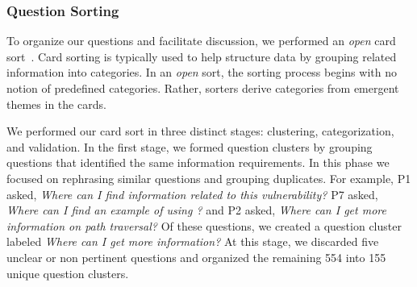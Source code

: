 \documentclass{acm_proc_article-sp}
\begin{document}
\subsubsection{Question Sorting}
To organize our questions and facilitate discussion, we performed an \textit{open} card sort~\cite{hudson2013sorting}. 
Card sorting is typically used to help structure data by grouping related information into categories. 
In an \textit{open} sort, the sorting process begins with no notion of predefined categories. 
Rather, sorters derive categories from emergent themes in the cards. 

We performed our card sort in three distinct stages: clustering, categorization, and validation.
In the first stage, we formed question clusters by grouping questions that identified the same information requirements. 
In this phase we focused on rephrasing similar questions and grouping duplicates.
For example, P1 asked, \textit{Where can I find information related to this vulnerability?} P7 asked, \textit{Where can I find an example of using ?} and P2 asked, \textit{Where can I get more information on path traversal?} 
Of these questions, we created a question cluster labeled \textit{Where can I get more information?}
At this stage, we discarded five unclear or non pertinent questions and organized the remaining 554 into 155 unique question clusters.
\end{document}
